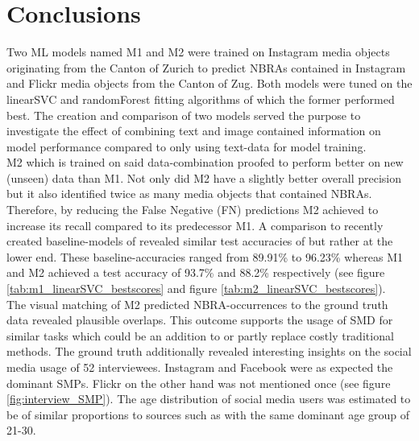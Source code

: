 \chapter{Conclusions} \label{conclusion_outlook}

Two ML models named M1 and M2 were trained on Instagram media objects originating from the Canton of Zurich to predict NBRAs contained in Instagram and Flickr media objects from the Canton of Zug. Both models were tuned on the linearSVC and randomForest fitting algorithms of which the former performed best. The creation and comparison of two models served the purpose to investigate the effect of combining text and image contained information on model performance compared to only using text-data for model training.\\
M2 which is trained on said data-combination proofed to perform better on new (unseen) data than M1. Not only did M2 have a slightly better overall precision but it also identified twice as many media objects that contained NBRAs. Therefore, by reducing the False Negative (FN) predictions M2 achieved to increase its recall compared to its predecessor M1. A comparison to recently created baseline-models of \parencite{Das2018, Li2018} revealed similar test accuracies of but rather at the lower end. These baseline-accuracies ranged from 89.91\% to 96.23\% whereas M1 and M2 achieved a test accuracy of 93.7\% and 88.2\% respectively (see figure \ref{tab:m1_linearSVC_bestscores} and figure \ref{tab:m2_linearSVC_bestscores}).\\
The visual matching of M2 predicted NBRA-occurrences to the ground truth data revealed plausible overlaps. This outcome supports the usage of SMD for similar tasks which could be an addition to or partly replace costly traditional methods. The ground truth additionally revealed interesting insights on the social media usage of 52 interviewees. Instagram and Facebook were as expected the dominant SMPs. Flickr on the other hand was not mentioned once (see figure \ref{fig:interview_SMP}). The age distribution of social media users was estimated to be of similar proportions  to sources such as \parencite{2013} with the same dominant age group of 21-30.

